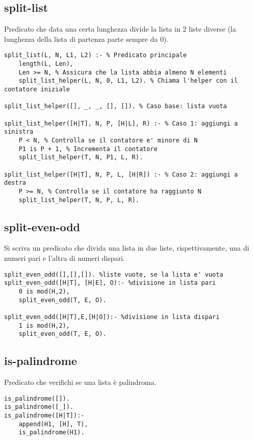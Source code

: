 \subsection{split-list}

Predicato che data una certa lunghezza divide la lista in 2 liste diverse (la lunghezza della lista di partenza parte sempre da 0).

\begin{lstlisting}
split_list(L, N, L1, L2) :- % Predicato principale
    length(L, Len),
    Len >= N, % Assicura che la lista abbia almeno N elementi
    split_list_helper(L, N, 0, L1, L2). % Chiama l'helper con il contatore iniziale

split_list_helper([], _, _, [], []). % Caso base: lista vuota

split_list_helper([H|T], N, P, [H|L], R) :- % Caso 1: aggiungi a sinistra
    P < N, % Controlla se il contatore e' minore di N
    P1 is P + 1, % Incrementa il contatore
    split_list_helper(T, N, P1, L, R).

split_list_helper([H|T], N, P, L, [H|R]) :- % Caso 2: aggiungi a destra
    P >= N, % Controlla se il contatore ha raggiunto N
    split_list_helper(T, N, P, L, R).
\end{lstlisting}

\subsection{split-even-odd}

Si scriva un predicato che divida una lista in due liste, rispettivamente, una di numeri pari e l'altra di numeri dispari.

\begin{lstlisting}
split_even_odd([],[],[]). %liste vuote, se la lista e' vuota
split_even_odd([H|T], [H|E], O):- %divisione in lista pari
    0 is mod(H,2),
    split_even_odd(T, E, O).

split_even_odd([H|T],E,[H|O]):- %divisione in lista dispari
    1 is mod(H,2),
    split_even_odd(T, E, O).
\end{lstlisting}

\subsection{is-palindrome}

Predicato che verifichi se una lista è palindroma.

\begin{lstlisting}
is_palindrome([]).
is_palindrome([_]).
is_palindrome([H|T]):-
    append(H1, [H], T),
    is_palindrome(H1).
\end{lstlisting}

